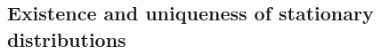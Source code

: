 \documentclass[twoside,10pt]{../jmlr}
\begin{document}
\subsection{Existence and uniqueness of stationary distributions}\label{sec: ergodicity and existence of stationary distribution}


%

\end{document}
